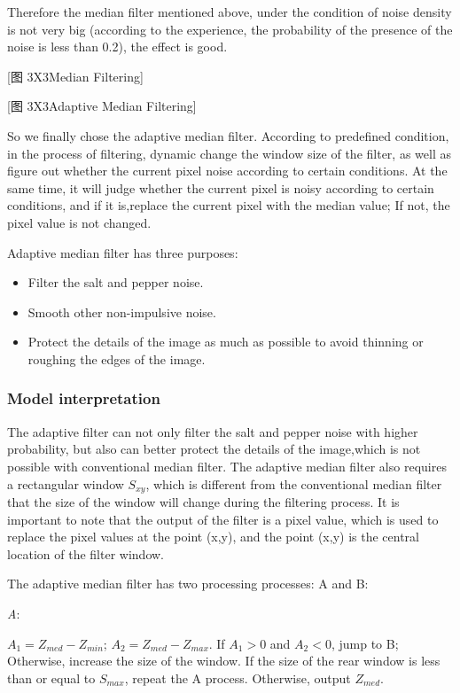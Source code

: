 \documentclass{mcmthesis}
\begin{document}
Therefore the median filter mentioned above, under the condition of noise density is not very big (according to the experience, the probability of the presence of the noise is less than 0.2), the effect is good.

[图 3X3Median Filtering]


[图 3X3Adaptive Median Filtering]

So we finally chose the adaptive median filter. According to predefined condition, in the process of filtering, dynamic change the window size of the filter, as well as figure out whether the current pixel noise according to certain conditions. At the same time, it will judge whether the current pixel is noisy according to certain conditions, and if it is,replace the current pixel with the median value; If not, the pixel value is not changed.

Adaptive median filter has three purposes:
\begin{itemize}
  \item Filter the salt and pepper noise.
  \item Smooth other non-impulsive noise.
  \item Protect the details of the image as much as possible to avoid thinning or roughing the edges of the image.
\end{itemize}

\subsubsection{Model interpretation}
The adaptive filter can not only filter the salt and pepper noise with higher probability, but also can better protect the details of the image,which is not possible with conventional median filter.
The adaptive median filter also requires a rectangular window $S_{xy}$, which is different from the conventional median filter that the size of the window will change during the filtering process.
It is important to note that the output of the filter is a pixel value, which is used to replace the pixel values at the point (x,y), and the point (x,y) is the central location of the filter window.

The adaptive median filter has two processing processes: A and B:

\emph{A}:

$A_1 = Z_{med}−Z_{min}$;   
$A_2 = Z_{med}−Z_{max}$.  
If $A_1 > 0$ and $A_2 < 0$, jump to B;
Otherwise, increase the size of the window.
If the size of the rear window is less than or equal to $S_{max}$, repeat the A process.
Otherwise, output $Z_{med}$.
\end{document}
